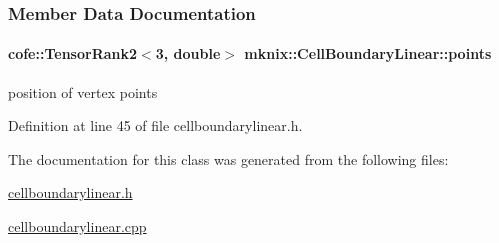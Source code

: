 \subsubsection{Member Data Documentation}
\hypertarget{classmknix_1_1_cell_boundary_linear_aacc5e09eb0a0659471b7d464f506d276}{}
\paragraph[{points}]{\setlength{\rightskip}{0pt plus 5cm}cofe\+::\+Tensor\+Rank2$<$3, double$>$ mknix\+::\+Cell\+Boundary\+Linear\+::points\hspace{0.3cm}{\ttfamily [protected]}}\label{classmknix_1_1_cell_boundary_linear_aacc5e09eb0a0659471b7d464f506d276}
position of vertex points 

Definition at line 45 of file cellboundarylinear.\+h.



The documentation for this class was generated from the following files\+:\begin{DoxyCompactItemize}
\item 
\hyperlink{cellboundarylinear_8h}{cellboundarylinear.\+h}\item 
\hyperlink{cellboundarylinear_8cpp}{cellboundarylinear.\+cpp}\end{DoxyCompactItemize}
